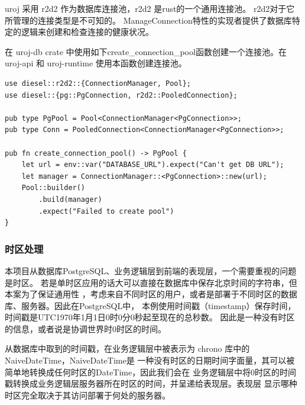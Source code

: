 uroj 采用 r2d2 作为数据库连接池，r2d2 是rust的一个通用连接池。
r2d2对于它所管理的连接类型是不可知的。
ManageConnection特性的实现者提供了数据库特定的逻辑来创建和检查连接的健康状况。

在 uroj-db crate 中使用如下create\_connection\_pool函数创建一个连接池。在
uroj-api 和 uroj-runtime 使用本函数创建连接池。
\begin{lstlisting}
use diesel::r2d2::{ConnectionManager, Pool};
use diesel::{pg::PgConnection, r2d2::PooledConnection};

pub type PgPool = Pool<ConnectionManager<PgConnection>>;
pub type Conn = PooledConnection<ConnectionManager<PgConnection>>;

pub fn create_connection_pool() -> PgPool {
    let url = env::var("DATABASE_URL").expect("Can't get DB URL");
    let manager = ConnectionManager::<PgConnection>::new(url);
    Pool::builder()
        .build(manager)
        .expect("Failed to create pool")
}
\end{lstlisting}

\subsubsection{时区处理}
本项目从数据库PostgreSQL、业务逻辑层到前端的表现层，一个需要重视的问题是时区。
若是单时区应用的话大可以直接在数据库中保存北京时间的字符串，但本案为了保证通用性
，考虑来自不同时区的用户，或者是部署于不同时区的数据库、服务器。因此在PostgreSQL中，
本例使用时间戳（timestamp）保存时间，时间戳是UTC1970年1月1日0时0分0秒起至现在的总秒数。
因此是一种没有时区的信息，或者说是协调世界时0时区的时间。

从数据库中取到的时间戳，在业务逻辑层中被表示为 chrono 库中的 NaiveDateTime，NaiveDateTime是
一种没有时区的日期时间字面量，其可以被简单地转换成任何时区的DateTime，因此我们会在
业务逻辑层中将0时区的时间戳转换成业务逻辑层服务器所在时区的时间，并呈递给表现层。表现层
显示哪种时区完全取决于其访问部署于何处的服务器。
